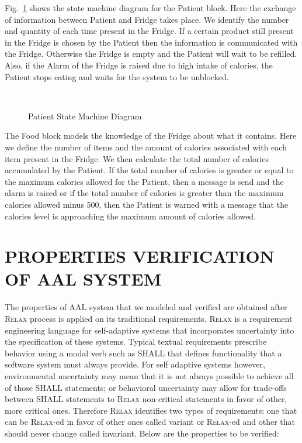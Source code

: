 \documentclass[a4paper,twoside]{article}
\def\myrelax{\textsc{Relax}}                  %
\begin{document}
Fig.~\ref{fig:patientstm} shows the state machine diagram for the Patient block. Here the exchange of information between Patient and Fridge takes place. We identify the number and quantity of each time present in the Fridge. If a certain product still present in the Fridge is chosen by the Patient then the information is  communicated with the Fridge.  Otherwise the Fridge is empty and the Patient will wait to be refilled. Also, if the Alarm of the Fridge is raised due to  high intake of calories, the Patient stops eating and waits for the system to be unblocked.
 
\begin{figure}[!h]
  \vspace{8cm}~
  \centering
  {}
  \caption{Patient State Machine Diagram}
  \label{fig:patientstm}
 \end{figure}
 
The Food block models the knowledge of the Fridge about what it contains. Here we define the number of items and the amount of calories associated with each item present in the Fridge. We then calculate the total number of calories accumulated by the Patient. If the total number of calories is greater or equal to the maximum calories allowed for the Patient, then a message is send and the alarm is raised or if the total number of calories is greater than the maximum calories allowed minus 500, then the Patient is warned with a message that the calories level is approaching the maximum amount of calories allowed.

\section{\uppercase{Properties Verification of AAL system}}
\label{properties verification}
The properties of AAL system that we modeled and verified are obtained after \myrelax{} process is applied on its traditional requirements. \myrelax{}  is  a  requirement  engineering language for self-adaptive systems that incorporates uncertainty into the specification of these systems. Typical  textual  requirements  prescribe behavior  using  a  modal  verb  such  as  SHALL  that defines  functionality  that  a  software  system  must always provide. For self adaptive systems however, environmental  uncertainty  may  mean  that  it  is  not always  possible  to  achieve  all  of  those  SHALL statements; or behavioral uncertainty may allow for trade-offs between SHALL statements to \myrelax{} non-critical  statements  in  favor  of  other,  more  critical ones.  Therefore  \myrelax{}  identifies  two  types  of requirements:  one  that  can  be  \myrelax{}-ed  in  favor  of other ones called variant or \myrelax{}-ed and other that should never change called invariant.
Below are the properties to be verified: 
\end{document}
